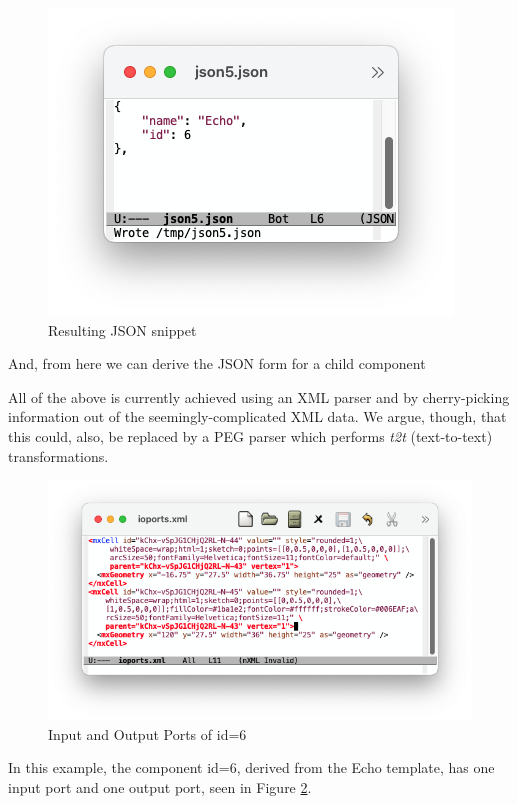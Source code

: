 \documentclass[10pt,anonymous,review]{acmart}
\begin{document}
\begin{figure}
    \includegraphics[scale=0.4]{./media/json5.png}
    \caption{Resulting JSON snippet}
    \label{json5}
\end{figure}
And, from here we can derive the JSON form for a child component

\vspace{1\baselineskip}
All of the above is currently achieved using an XML parser and by cherry-picking information out of
the seemingly-complicated XML data. We argue, though, that this could, also, be replaced
by a PEG parser which performs \emph{t2t} (text-to-text) transformations.

\vspace{5.3\baselineskip}

\begin{figure}[h]
    \includegraphics[scale=0.4]{./media/ioports.png}
    \caption{Input and Output Ports of id=6}
    \label{ioports}
\end{figure}
In this example, the component id=6, derived from the Echo template, has one input port and one output port, seen in Figure \ref{ioports}.
\end{document}
